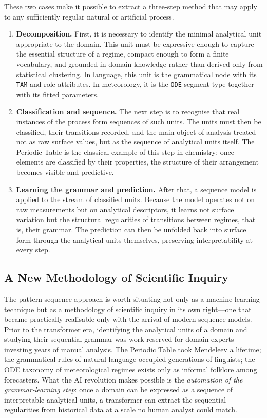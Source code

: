 \documentclass[12pt,a4paper,oneside]{report}
\begin{document}
These two cases make it possible to extract a three-step method that may apply to any sufficiently regular natural or artificial process.

\begin{enumerate}
  \item \textbf{Decomposition.}
        First, it is necessary to identify the minimal analytical unit appropriate to the domain.
        This unit must be expressive enough to capture the essential structure of a regime,
        compact enough to form a finite vocabulary, and grounded in domain knowledge rather
        than derived only from statistical clustering.
        In language, this unit is the grammatical node with its \texttt{TAM} and role attributes.
        In meteorology, it is the \texttt{ODE} segment type together with its fitted parameters.

  \item \textbf{Classification and sequence.}
        The next step is to recognise that real instances of the process form sequences of such units.
        The units must then be classified, their transitions recorded, and the main object of analysis
        treated not as raw surface values, but as the sequence of analytical units itself.
        The Periodic Table is the classical example of this step in chemistry: once elements are
        classified by their properties, the structure of their arrangement becomes visible and predictive.

  \item \textbf{Learning the grammar and prediction.}
        After that, a sequence model is applied to the stream of classified units.
        Because the model operates not on raw measurements but on analytical descriptors,
        it learns not surface variation but the structural regularities of transitions between regimes,
        that is, their grammar. The prediction can then be unfolded back into surface form through
        the analytical units themselves, preserving interpretability at every step.
\end{enumerate}

\subsection*{A New Methodology of Scientific Inquiry}

The pattern-sequence approach is worth situating not only as a machine-learning technique
but as a methodology of scientific inquiry in its own right---one that became practically
realisable only with the arrival of modern sequence models.
Prior to the transformer era, identifying the analytical units of a domain and studying
their sequential grammar was work reserved for domain experts investing years of manual
analysis. The Periodic Table took Mendeleev a lifetime; the grammatical rules of natural
language occupied generations of linguists; the ODE taxonomy of meteorological regimes
exists only as informal folklore among forecasters.
What the AI revolution makes possible is the \emph{automation of the grammar-learning step}:
once a domain can be expressed as a sequence of interpretable analytical units, a
transformer can extract the sequential regularities from historical data at a scale no human
analyst could match.
\end{document}
